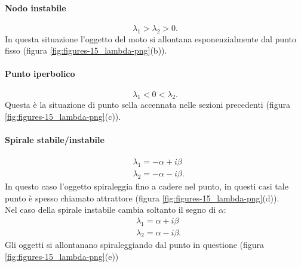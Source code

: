 \paragraph{Nodo instabile}%
\label{par:Nodo instabile}
\[
    \lambda_1 > \lambda_2 > 0
.\] 
In questa situazione l'oggetto del moto si allontana esponenzialmente dal punto fisso (figura \ref{fig:figures-15_lambda-png}(b)).
\paragraph{Punto iperbolico}%
\label{par:Punto iperbolico}
\[
    \lambda_1<0<\lambda_2
.\] 
Questa è la situazione di punto sella accennata nelle sezioni precedenti (figura \ref{fig:figures-15_lambda-png}(c)).
\paragraph{Spirale stabile/instabile}%
\label{par:Spirale stabile}
\[\begin{aligned}
    & \lambda_1 = -\alpha+i\beta\\
    & \lambda_2=-\alpha-i\beta
.\end{aligned}\]
In questo caso l'oggetto spiraleggia fino a cadere nel punto, in questi casi tale punto è spesso chiamato attrattore (figura \ref{fig:figures-15_lambda-png}(d)).\\
Nel caso della spirale instabile cambia soltanto il segno di $\alpha$:
\[\begin{aligned}
    & \lambda_1 = \alpha+i\beta\\
    & \lambda_2= \alpha-i\beta
.\end{aligned}\]
Gli oggetti si allontanano spiraleggiando dal punto in questione (figura \ref{fig:figures-15_lambda-png}(e))
